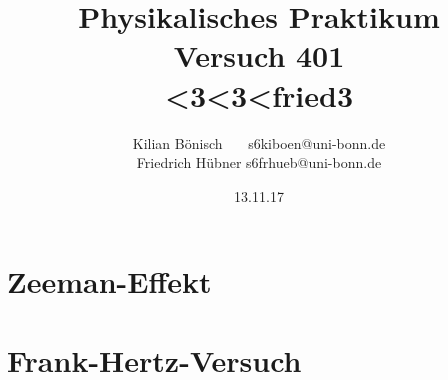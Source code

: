 \documentclass{article}
\newcommand{\RM}[1]{\MakeUppercase{\romannumeral #1}}
\begin{document}
\setlength{\parindent}{0em}   %
\title{Physikalisches Praktikum \RM{4}\\Versuch 401\\<3<3<fried3}
\author{Kilian Bönisch \ \ \ \qquad s6kiboen@uni-bonn.de \\
  Friedrich Hübner \qquad s6frhueb@uni-bonn.de }
\date{13.11.17}

\maketitle

\newpage

\thispagestyle{empty}

\tableofcontents

\newpage



\section{Zeeman-Effekt}




\section{Frank-Hertz-Versuch}







\FloatBarrier
\printbibliography

\newpage
\end{document}
